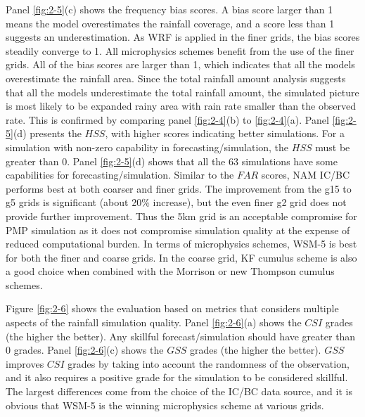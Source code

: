 Panel \ref{fig:2-5}(c) shows the frequency bias scores. A bias score larger than 1 means the model overestimates the rainfall coverage, and a score less than 1 suggests an underestimation. As WRF is applied in the finer grids, the bias scores steadily converge to 1. All microphysics schemes benefit from the use of the finer grids. All of the bias scores are larger than 1, which indicates that all the models overestimate the rainfall area. Since the total rainfall amount analysis suggests that all the models underestimate the total rainfall amount, the simulated picture is most likely to be expanded rainy area with rain rate smaller than the observed rate. This is confirmed by comparing panel \ref{fig:2-4}(b) to \ref{fig:2-4}(a). Panel \ref{fig:2-5}(d) presents the $HSS$, with higher scores indicating better simulations. For a simulation with non-zero capability in forecasting/simulation, the $HSS$ must be greater than 0. Panel \ref{fig:2-5}(d) shows that all the 63 simulations have some capabilities for forecasting/simulation. Similar to the $FAR$ scores, NAM IC/BC performs best at both coarser and finer grids. The improvement from the g15 to g5 grids is significant (about 20\% increase), but the even finer g2 grid does not provide further improvement. Thus the 5km grid is an acceptable compromise for PMP simulation as it does not compromise simulation quality at the expense of reduced computational burden. In terms of microphysics schemes, WSM-5 is best for both the finer and coarse grids. In the coarse grid, KF cumulus scheme is also a good choice when combined with the Morrison or new Thompson cumulus schemes.

Figure \ref{fig:2-6} shows the evaluation based on metrics that considers multiple aspects of the rainfall simulation quality. Panel \ref{fig:2-6}(a) shows the $CSI$ grades (the higher the better). Any skillful forecast/simulation should have greater than 0 grades. Panel \ref{fig:2-6}(c) shows the $GSS$ grades (the higher the better). $GSS$ improves $CSI$ grades by taking into account the randomness of the observation, and it also requires a positive grade for the simulation to be considered skillful. The largest differences come from the choice of the IC/BC data source, and it is obvious that WSM-5 is the winning microphysics scheme at various grids.

